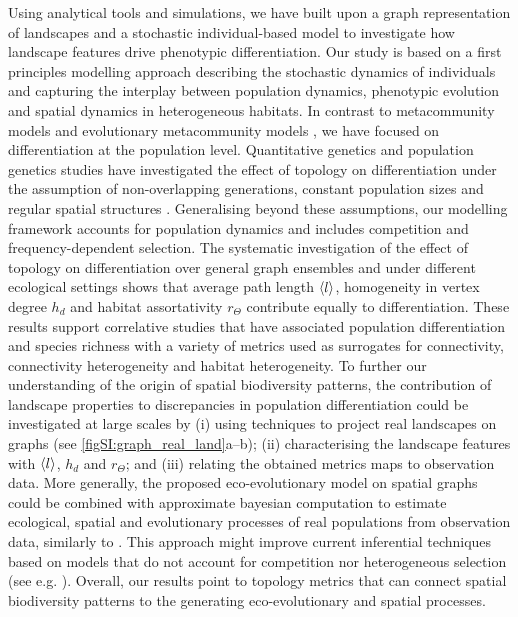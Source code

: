 Using analytical tools and simulations, we have built upon a graph representation of landscapes and a stochastic individual-based model to investigate how landscape features drive phenotypic differentiation.
%
Our study is based on a first principles modelling approach \cite{Champagnat2006} describing the stochastic dynamics of individuals and capturing the interplay between population dynamics, phenotypic evolution and spatial dynamics in heterogeneous habitats. In contrast to metacommunity models \cite{Holland2008,Gilarranz2012,Mari2014,Gravel2016,Carrara2012,Thompson2017,Suzuki2021} and evolutionary metacommunity models \cite{Economo2007,Economo2010}, we have focused on differentiation at the population level. Quantitative genetics and population genetics studies have investigated the effect of topology on differentiation under the assumption of non-overlapping generations, constant population sizes and regular spatial structures \cite{Burger2000,Kimura1964,Lande1991,Nagylaki1994,Yeaman2011}. Generalising beyond these assumptions, our modelling framework accounts for population dynamics and includes competition and frequency-dependent selection. The systematic investigation of the effect of topology on differentiation over general graph ensembles and under different ecological settings shows that average path length $\langle l \rangle$, homogeneity in vertex degree $h_d$ and habitat assortativity $r_\Theta$ contribute equally to differentiation.
%
These results support correlative studies that have associated population differentiation \cite{Manel2003,McRae2007} and species richness \cite{Liu2018,Dias2014,Rahbek2001,Kreft2007a,Davies2007,Veech2007,Guegan1998,Stein2014} with a variety of metrics used as surrogates for connectivity, connectivity heterogeneity and habitat heterogeneity. 
%
To further our understanding of the origin of spatial biodiversity patterns, the contribution of landscape properties to discrepancies in population differentiation could be investigated at large scales by (i) using techniques to project real landscapes on graphs (see \cref{figSI:graph_real_land}a--b); (ii) characterising the landscape features with $\langle l \rangle$, $h_d$ and $r_\Theta$; and (iii) relating the obtained metrics maps to observation data. 
%
More generally, the proposed eco-evolutionary model on spatial graphs could be combined with approximate bayesian computation to estimate ecological, spatial and evolutionary processes of real populations from observation data, similarly to \cite{Lepers2021}. This approach might improve current inferential techniques based on models that do not account for competition nor heterogeneous selection (see e.g. \cite{Petkova2015}).
%
Overall, our results point to topology metrics that can connect spatial biodiversity patterns to the generating eco-evolutionary and spatial processes.

